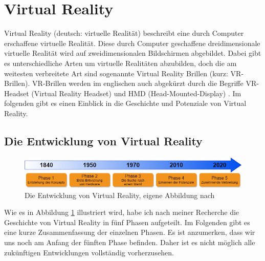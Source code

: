\section{Virtual Reality}\label{sec:VR}
Virtual Reality (deutsch: virtuelle Realität) beschreibt eine durch Computer erschaffene virtuelle Realität. Diese durch Computer geschaffene dreidimensionale virtuelle Realität wird auf zweidimensionalen Bildschirmen abgebildet. Dabei gibt es unterschiedliche Arten um virtuelle Realitäten abzubilden, doch die am weitesten verbreitete Art sind sogenannte Virtual Reality Brillen (kurz: VR-Brillen). VR-Brillen werden im englischen auch abgekürzt durch die Begriffe VR-Headset (Virtual Reality Headset) und HMD (Head-Mounted-Display) \cite{19}. Im folgenden gibt es einen Einblick in die Geschichte und Potenziale von Virtual Reality.

\subsection{Die Entwicklung von Virtual Reality}\label{sec:VRGeschichte}
\begin{figure}[h]
	\centering
	\includegraphics[width=1\linewidth]{Bilder/A12_GeschichteVR}
	\caption{Die Entwicklung von Virtual Reality, eigene Abbildung nach \cite{20,21,22,23}}
	\label{fig:GeschichteVR}
\end{figure}
\noindent Wie es in Abbildung \ref{fig:GeschichteVR} illustriert wird, habe ich nach meiner Recherche die Geschichte von Virtual Reality in fünf Phasen aufgeteilt. Im Folgenden gibt es eine kurze Zusammenfassung der einzelnen Phasen. Es ist anzumerken, dass wir uns noch am Anfang der fünften Phase befinden. Daher ist es nicht möglich alle zukünftigen Entwicklungen vollständig vorherzusehen.

